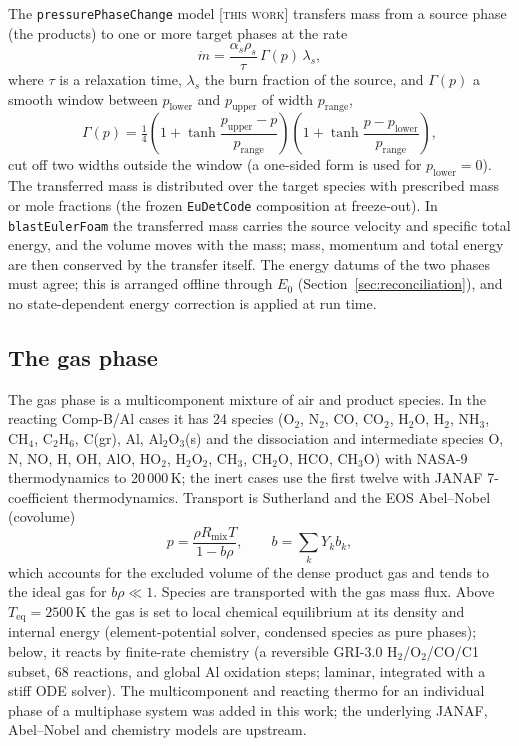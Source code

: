 \documentclass{article}
\newcommand{\tw}{\textsc{[this work]}}
\begin{document}
The \texttt{pressurePhaseChange} model \tw{} transfers mass from a source phase (the products) to one or more target phases at the rate
\begin{equation}
    \dot m = \frac{\alpha_s\rho_s}{\tau}\,\Gamma(p)\,\lambda_s,
\end{equation}
where $\tau$ is a relaxation time, $\lambda_s$ the burn fraction of the source, and $\Gamma(p)$ a smooth window between $p_\text{lower}$ and $p_\text{upper}$ of width $p_\text{range}$,
\begin{equation}
    \Gamma(p) = \tfrac14\left(1 + \tanh\frac{p_\text{upper} - p}{p_\text{range}}\right)\left(1 + \tanh\frac{p - p_\text{lower}}{p_\text{range}}\right),
\end{equation}
cut off two widths outside the window (a one-sided form is used for $p_\text{lower} = 0$). The transferred mass is distributed over the target species with prescribed mass or mole fractions (the frozen \texttt{EuDetCode} composition at freeze-out). In \texttt{blastEulerFoam} the transferred mass carries the source velocity and specific total energy, and the volume moves with the mass; mass, momentum and total energy are then conserved by the transfer itself. The energy datums of the two phases must agree; this is arranged offline through $E_0$ (Section~\ref{sec:reconciliation}), and no state-dependent energy correction is applied at run time.

\subsection{The gas phase}
\label{sec:gasphase}

The gas phase is a multicomponent mixture of air and product species. In the reacting Comp-B/Al cases it has 24 species (O$_2$, N$_2$, CO, CO$_2$, H$_2$O, H$_2$, NH$_3$, CH$_4$, C$_2$H$_6$, C(gr), Al, Al$_2$O$_3$(s) and the dissociation and intermediate species O, N, NO, H, OH, AlO, HO$_2$, H$_2$O$_2$, CH$_3$, CH$_2$O, HCO, CH$_3$O) with NASA-9 thermodynamics to 20\,000\,K; the inert cases use the first twelve with JANAF 7-coefficient thermodynamics. Transport is Sutherland and the EOS Abel--Nobel (covolume)
\begin{equation}
    p = \frac{\rho R_\text{mix} T}{1 - b\rho}, \qquad b = \sum_k Y_k b_k,
\end{equation}
which accounts for the excluded volume of the dense product gas and tends to the ideal gas for $b\rho \ll 1$. Species are transported with the gas mass flux. Above $T_\text{eq} = 2500$\,K the gas is set to local chemical equilibrium at its density and internal energy (element-potential solver, condensed species as pure phases); below, it reacts by finite-rate chemistry (a reversible GRI-3.0 H$_2$/O$_2$/CO/C1 subset, 68 reactions, and global Al oxidation steps; laminar, integrated with a stiff ODE solver). The multicomponent and reacting thermo for an individual phase of a multiphase system was added in this work; the underlying JANAF, Abel--Nobel and chemistry models are upstream.
\end{document}

